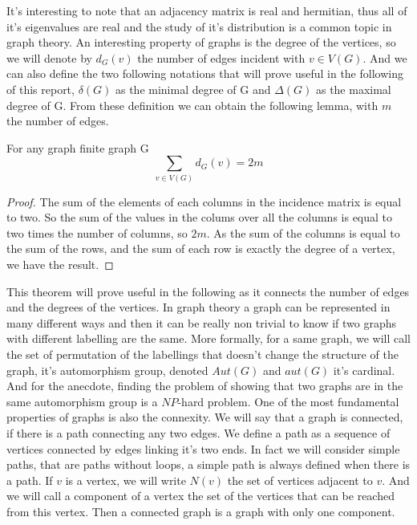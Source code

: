 It's interesting to note that an adjacency matrix is real and hermitian, thus all of it's eigenvalues are real and the study of it's distribution is a common topic in graph theory.
\newline
An interesting property of graphs is the degree of the vertices, so we will denote by $d_G(v)$ the number of edges incident with $v \in V(G)$. And we can also define the two following notations that will prove useful in the following of this report, $\delta(G)$ as the minimal degree of G and $\Delta(G)$ as the maximal degree of G.
From these definition we can obtain the following lemma, with $m$ the number of edges.
\begin{theorem}
For any graph finite graph G
\begin{equation}
    \sum_{v\in V(G)} d_G(v) = 2m
\end{equation}
\end{theorem}
\begin{proof}
The sum of the elements of each columns in the incidence matrix is equal to two. So the sum of the values in the colums over all the columns is equal to two times the number of columns, so $2m$. As the sum of the columns is equal to the sum of the rows, and the sum of each row is exactly the degree of a vertex, we have the result.  
\end{proof}
This theorem will prove useful in the following as it connects the number of edges and the degrees of the vertices. In graph theory a graph can be represented in many different ways and then it can be really non trivial to know if two graphs with different labelling are the same. More formally, for a same graph, we will call the set of permutation of the labellings that doesn't change the structure of the graph, it's automorphism group, denoted $Aut(G)$ and $aut(G)$ it's cardinal. And for the anecdote, finding the problem of showing that two graphs are in the same automorphism group is a $NP$-hard problem.
\newline
One of the most fundamental properties of graphs is also the connexity. We will say that a graph is connected, if there is a path connecting any two edges. We define a path as a sequence of vertices connected by edges linking it's two ends. In fact we will consider simple paths, that are paths without loops, a simple path is always defined when there is a path. If $v$ is a vertex, we will write $N(v)$ the set of vertices adjacent to $v$. And we will call a component of a vertex the set of the vertices that can be reached from this vertex. 
Then a connected graph is a graph with only one component.
